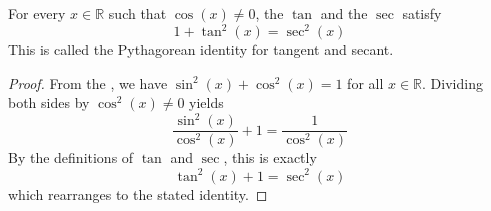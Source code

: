 \begin{proposition} \label{proposition:pythagorean_identity_for_tangent_and_secant}
    For every $x \in \mathbb{R}$ such that $\cos(x) \neq 0$, the  $\tan$ and the  $\sec$ satisfy
    $$1 + \tan^2(x) = \sec^2(x)$$
    This is called the Pythagorean identity for tangent and secant.
    \end{proposition}
    \begin{proof}
    From the , we have $\sin^2(x) + \cos^2(x) = 1$ for all $x \in \mathbb{R}$. Dividing both sides by $\cos^2(x) \neq 0$ yields
    $$\frac{\sin^2(x)}{\cos^2(x)} + 1 = \frac{1}{\cos^2(x)}$$
    By the definitions of $\tan$ and $\sec$, this is exactly
    $$\tan^2(x) + 1 = \sec^2(x)$$
    which rearranges to the stated identity.
\end{proof}